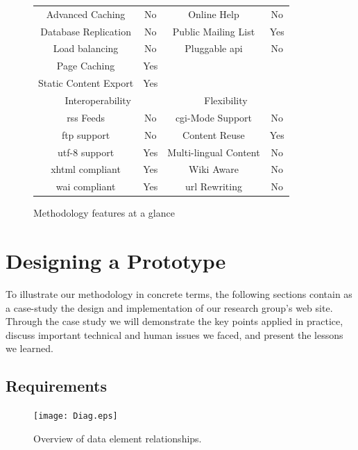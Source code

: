 \documentclass{article}
\begin{document}
\begin{figure}
\begin{center}
\begin{tabular}{c c | c c}
\hline
Advanced Caching & No & Online Help & No\\
Database Replication & No & Public Mailing List & Yes\\
Load balancing & No & Pluggable {\sc api} & No\\
Page Caching & Yes & &\\
Static Content Export & Yes & &\\
\hline
\multicolumn{2}{c|}{Interoperability} & \multicolumn{2}{c}{Flexibility}\\
\hline
{\sc rss} Feeds & No & {\sc cgi}-Mode Support & No\\
{\sc ftp} support & No & Content Reuse & Yes\\
{\sc utf-8} support & Yes & Multi-lingual Content & No\\
{\sc xhtml} compliant & Yes & Wiki Aware & No\\
{\sc wai} compliant & Yes & {\sc url} Rewriting & No\\
\hline
\end{tabular}
\end{center}
\caption{Methodology features at a glance}
\label{tbl:cms-matrix}
\end{figure}

\section{Designing a Prototype}

To illustrate our methodology in concrete terms, 
the following sections contain as a case-study the design and implementation
of our research group's web site.
Through the case study we will demonstrate the key points applied in
practice, discuss important technical and human issues we faced,
and present the lessons we learned.

\subsection{Requirements}
\label{sec:requirements}

\begin{figure}
\begin{center}
\texttt{[image: Diag.eps]}
\end{center}
\caption{Overview of data element relationships.}
\label{fig:diag}
\end{figure}
\end{document}
